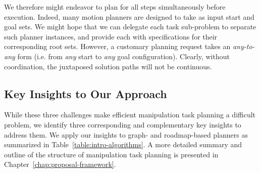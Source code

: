 We therefore might endeavor to plan for all steps
simultaneously before execution.
Indeed,
many motion planners are designed to take as input
start and goal sets.
We might hope that we can delegate each task sub-problem to
separate such planner instances,
and provide each with specifications for their corresponding
root sets.
However,
a customary planning request takes an \emph{any-to-any} form
(i.e. from \emph{any} start to \emph{any} goal configuration).
Clearly, without coordination,
the juxtaposed solution paths will not be continuous.

\subsection*{Key Insights to Our Approach}

While these three challenges make efficient
manipulation task planning a difficult problem,
we identify three corresponding and complementary
key insights to address them.
We apply our insights to graph- and roadmap-based planners
as summarized in Table~\ref{table:intro-algorithms}.
A more detailed summary and outline of the structure of
manipulation task planning is presented in
Chapter~\ref{chap:proposal-framework}.

